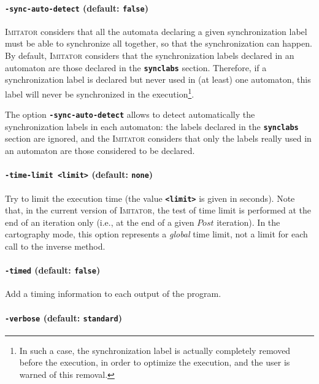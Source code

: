 \documentclass[a4paper,11pt]{article}
\newcommand{\imitator}{\textsc{Imitator}}
\newcommand{\code}[1]{\textbf{\texttt{#1}}}
\begin{document}
\paragraph{\code{-sync-auto-detect} (default: \code{false})}
\imitator{} considers that all the automata declaring a given synchronization label must be able to synchronize all together, so that the synchronization can happen.
By default, \imitator{} considers that the synchronization labels declared in an automaton are those declared in the \code{synclabs} section.
Therefore, if a synchronization label is declared but never used in (at least) one automaton, this label will never be synchronized in the execution\footnote{In such a case, the synchronization label is actually completely removed before the execution, in order to optimize the execution, and the user is warned of this removal.}.

The option \code{-sync-auto-detect} allows to detect automatically the synchronization labels in each automaton: the labels declared in the \code{synclabs} section are ignored, and the \imitator{} considers that only the labels really used in an automaton are those considered to be declared.


\paragraph{\code{-time-limit <limit>} (default: \code{none})}
Try to limit the execution time (the value \code{<limit>} is given in seconds).
Note that, in the current version of \imitator{}, the test of time limit is performed at the end of an iteration only (i.e., at the end of a given $\mathit{Post}$ iteration).
In the cartography mode, this option represents a \emph{global} time limit, not a limit for each call to the inverse method.


\paragraph{\code{-timed} (default: \code{false})}
Add a timing information to each output of the program.


\paragraph{\code{-verbose} (default: \code{standard})}
\end{document}
